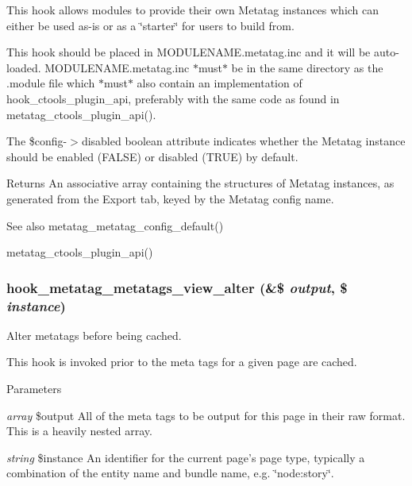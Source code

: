 This hook allows modules to provide their own Metatag instances which can either be used as-\/is or as a \char`\"{}starter\char`\"{} for users to build from.

This hook should be placed in MODULENAME.metatag.inc and it will be auto-\/ loaded. MODULENAME.metatag.inc $\ast$must$\ast$ be in the same directory as the .module file which $\ast$must$\ast$ also contain an implementation of hook\_\-ctools\_\-plugin\_\-api, preferably with the same code as found in metatag\_\-ctools\_\-plugin\_\-api().

The \$config-\/$>$disabled boolean attribute indicates whether the Metatag instance should be enabled (FALSE) or disabled (TRUE) by default.

\begin{DoxyReturn}{Returns}
An associative array containing the structures of Metatag instances, as generated from the Export tab, keyed by the Metatag config name.
\end{DoxyReturn}
\begin{DoxySeeAlso}{See also}
metatag\_\-metatag\_\-config\_\-default() 

metatag\_\-ctools\_\-plugin\_\-api() 
\end{DoxySeeAlso}
\hypertarget{metatag_8api_8php_a1a58a0a75630be58619b59923f79374c}{
\subsubsection[{hook\_\-metatag\_\-metatags\_\-view\_\-alter}]{\setlength{\rightskip}{0pt plus 5cm}hook\_\-metatag\_\-metatags\_\-view\_\-alter (\&\$ {\em output}, \/  \$ {\em instance})}}
\label{metatag_8api_8php_a1a58a0a75630be58619b59923f79374c}
Alter metatags before being cached.

This hook is invoked prior to the meta tags for a given page are cached.


\begin{DoxyParams}{Parameters}
\item[{\em array}]\$output All of the meta tags to be output for this page in their raw format. This is a heavily nested array. \item[{\em string}]\$instance An identifier for the current page's page type, typically a combination of the entity name and bundle name, e.g. \char`\"{}node:story\char`\"{}. \end{DoxyParams}
